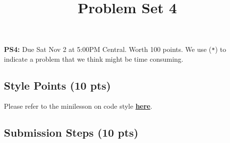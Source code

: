\documentclass[
  letterpaper,
  DIV=11,
  numbers=noendperiod]{scrartcl}
\title{Problem Set 4}
\author{}
\date{}
\begin{document}
\maketitle



\textbf{PS4:} Due Sat Nov 2 at 5:00PM Central. Worth 100 points. We use
(\texttt{*}) to indicate a problem that we think might be time
consuming.

\subsection{Style Points (10 pts)}\label{style-points-10-pts}

Please refer to the minilesson on code style
\textbf{\href{https://uchicago.zoom.us/rec/share/pG_wQ-pHTQrJTmqNn4rcrw5V194M2H2s-2jdy8oVhWHkd_yZt9o162IWurpA-fxU.BIQlSgZLRYctvzp-}{here}}.

\subsection{Submission Steps (10 pts)}\label{submission-steps-10-pts}
\end{document}
